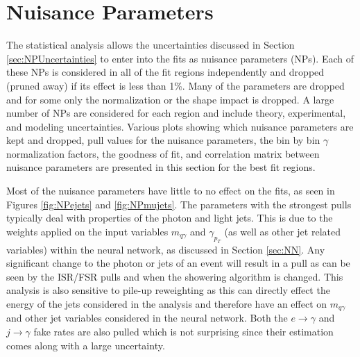 \section{Nuisance Parameters}
The statistical analysis allows the uncertainties discussed in Section \ref{sec:NPUncertainties} to enter into the fits as nuisance parameters (NPs).  Each of these NPs is considered in all of the fit regions independently and dropped (pruned away) if its effect is less than 1\%.  Many of the parameters are dropped and for some only the normalization or the shape impact is dropped.  A large number of NPs are considered for each region and include theory, experimental, and modeling uncertainties.  Various plots showing which nuisance parameters are kept and dropped, pull values for the nuisance parameters, the bin by bin $\gamma$ normalization factors, the goodness of fit, and correlation matrix between nuisance parameters are presented in this section for the best fit regions.

Most of the nuisance parameters have little to no effect on the fits, as seen in Figures \ref{fig:NPejets} and \ref{fig:NPmujets}.  The parameters with the strongest pulls typically deal with properties of the photon and light jets.  This is due to the weights applied on the input variables $m_{q\gamma}$ and $\gamma_{p_T}$ (as well as other jet related variables) within the neural network, as discussed in Section \ref{sec:NN}.  Any significant change to the photon or jets of an event will result in a pull as can be seen by the ISR/FSR pulls and when the showering algorithm is changed.  This analysis is also sensitive to pile-up reweighting as this can directly effect the energy of the jets considered in the analysis and therefore have an effect on $m_{q\gamma}$ and other jet variables considered in the neural network.  Both the $e\rightarrow \gamma$ and $j\rightarrow \gamma$ fake rates are also pulled which is not surprising since their estimation comes along with a large uncertainty.


